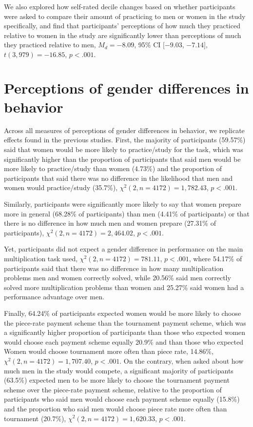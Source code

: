\documentclass[a4paper, nobind]{templates/ociamthesis}
\begin{document}
We also explored how self-rated decile changes based on whether participants were asked to compare their amount of practicing to men or women in the study specifically, and find that participants' perceptions of how much they practiced relative to women in the study are significantly lower than perceptions of much they practiced relative to men, \(M_d = -8.09\), 95\% CI \([-9.03\), \(-7.14]\), \(t(3,979) = -16.85\), \(p < .001\).

\hypertarget{perceptions-of-gender-differences-in-behavior}{%
\section{Perceptions of gender differences in behavior}\label{perceptions-of-gender-differences-in-behavior}}

Across all measures of perceptions of gender differences in behavior, we replicate effects found in the previous studies. First, the majority of participants (59.57\%) said that women would be more likely to practice/study for the task, which was significantly higher than the proportion of participants that said men would be more likely to practice/study than women (4.73\%) and the proportion of participants that said there was no difference in the likelihood that men and women would practice/study (35.7\%), \(\chi^2(2, n = 4172) = 1,782.43\), \(p < .001\).

Similarly, participants were significantly more likely to say that women prepare more in general (68.28\% of participants) than men (4.41\% of participants) or that there is no difference in how much men and women prepare (27.31\% of participants), \(\chi^2(2, n = 4172) = 2,464.02\), \(p < .001\).

Yet, participants did not expect a gender difference in performance on the main multiplication task used, \(\chi^2(2, n = 4172) = 781.11\), \(p < .001\), where 54.17\% of participants said that there was no difference in how many multiplication problems men and women correctly solved, while 20.56\% said men correctly solved more multiplication problems than women and 25.27\% said women had a performance advantage over men.

Finally, 64.24\% of participants expected women would be more likely to choose the piece-rate payment scheme than the tournament payment scheme, which was a significantly higher proportion of participants than those who expected women would choose each payment scheme equally 20.9\% and than those who expected Women would choose tournament more often than piece rate, 14.86\%, \(\chi^2(2, n = 4172) = 1,707.40\), \(p < .001\). On the contrary, when asked about how much men in the study would compete, a significant majority of participants (63.5\%) expected men to be more likely to choose the tournament payment scheme over the piece-rate payment scheme, relative to the proportion of participants who said men would choose each payment scheme equally (15.8\%) and the proportion who said men would choose piece rate more often than tournament (20.7\%), \(\chi^2(2, n = 4172) = 1,620.33\), \(p < .001\).
\end{document}
